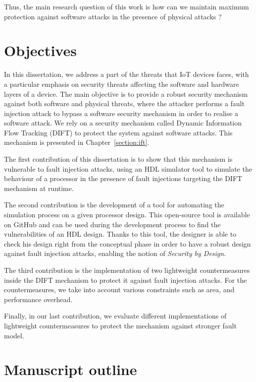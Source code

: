 Thus, the main research question of this work is how can we maintain maximum protection against software attacks in the presence of physical attacks ?

\section{Objectives}

In this dissertation, we address a part of the threats that IoT devices faces, with a particular emphasis on security threats affecting the software and hardware layers of a device. The main objective is to provide a robust security mechanism against both software and physical threats, where the attacker performs a fault injection attack to bypass a software security mechanism in order to realise a software attack.
We rely on a security mechanism called Dynamic Information Flow Tracking (DIFT) to protect the system against software attacks. This mechanism is presented in Chapter~\ref{section:ift}.

The first contribution of this dissertation is to show that this mechanism is vulnerable to fault injection attacks, using an HDL simulator tool to simulate the behaviour of a processor in the presence of fault injections targeting the DIFT mechanism at runtime.

The second contribution is the development of a tool for automating the simulation process on a given processor design. This open-source tool is available on GitHub and can be used during the development process to find the vulnerabilities of an HDL design. Thanks to this tool, the designer is able to check his design right from the conceptual phase in order to have a robust design against fault injection attacks, enabling the notion of \textit{Security by Design}.

The third contribution is the implementation of two lightweight countermeasures inside the DIFT mechanism to protect it against fault injection attacks. For the countermeasures, we take into account various constraints such as area, and performance overhead.

Finally, in our last contribution, we evaluate different implementations of lightweight countermeasures to protect the mechanism against stronger fault model.


\section{Manuscript outline}

